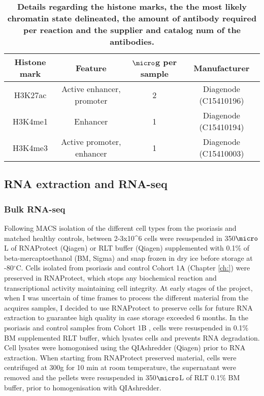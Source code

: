 \begin{table}[htbp]
\setlength{\tabcolsep}{20pt}
\renewcommand{\arraystretch}{1.5}
\begin{tabular}{@{} c c c c}
\toprule
\textbf{Histone mark} & \textbf{Feature} &\textbf{$\micro$g per sample} & \textbf{Manufacturer}\\
\midrule
H3K27ac & Active enhancer, promoter & 2 & Diagenode (C15410196)\\
H3K4me1 & Enhancer & 1 & Diagenode (C15410194)\\
H3K4me3 & Active promoter, enhancer & 1 & Diagenode (C15410003) \\
\bottomrule
\end{tabular}
\medskip %
\caption[Antibody panel used for immunoprecipitation of histone marks in ChIPm]{\textbf{Details regarding the histone marks, the the most likely chromatin state delineated, the amount of antibody required per reaction and the supplier and catalog num of the antibodies.}}
\label{tab:ChIPm_antibodies}
\end{table}
\bigskip %


\subsection{RNA extraction and RNA-seq}

\subsubsection{Bulk RNA-seq}
Following MACS isolation of the different cell types from the psoriasis and matched healthy controls, between 2-3x10^6 cells were resuspended in 350$\micro$L of RNAProtect (Qiagen) or RLT buffer (Qiagen) supplemented with 0.1\% of beta-mercaptoethanol (BM, Sigma) and snap frozen in dry ice before storage at -80{$^\circ$}C. Cells isolated from psoriasis and control Cohort 1A (Chapter \ref{ch:}) were preserved in RNAProtect, which stops any biochemical reaction and transcriptional activity maintaining cell integrity. At early stages of the project, when I was uncertain of time frames to process the different material from the acquires samples, I decided to use RNAProtect to preserve cells for future RNA extraction to guarantee high quality in case storage exceeded 6 months. In the psoriasis and control samples from Cohort 1B %
, cells were resuspended in 0.1\% BM supplemented RLT buffer, which lysates cells and prevents RNA degradation. Cell lysates were homogonised using the QIAshredder (Qiagen) prior to RNA extraction. When starting from RNAProtect preserved material, cells were centrifuged at 300g for 10 min at room temperature, the supernatant were removed and the pellets were resuspended in 350$\micro$L of RLT 0.1\% BM buffer, prior to homogenisation with QIAshredder.

